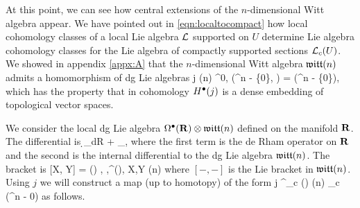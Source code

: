 \documentclass[11pt]{amsart}
\begin{document}
At this point, we can see how central extensions of the $n$-dimensional Witt algebra appear.
We have pointed out in \eqref{eqn:localtocompact} how local cohomology classes of a local Lie algebra $\mathcal L$ supported on $U$ determine Lie algebra cohomology classes for the Lie algebra of compactly supported sections $\mathcal L_c(U)$.
We showed in appendix \ref{appx:A} that the $n$-dimensional Witt algebra $\mathfrak{witt}(n)$ admits a homomorphism of dg Lie algebras
\beqn
j \colon {}(n) \hookrightarrow \Omega^{0,\bu} (\C^n - \{0\}, \T) = \cT(\C^n - \{0\}),
\eeqn
which has the property that in cohomology $H^\bullet(j)$ is a dense embedding of topological vector spaces.

We consider the local dg Lie algebra $\Omega^\bullet(\mathbf{R}) \otimes \mathfrak{witt}(n)$ defined on the manifold $\mathbf{R}$.
The differential is 
\beqn
\d_{dR} \otimes \id + \id \otimes \dbar_{},
\eeqn
where the first term is the de Rham operator on $\mathbf{R}$ and the second is the internal differential to the dg Lie algebra $\mathfrak{witt}(n)$.
The bracket is
\beqn\label{eqn:tensorbracket}
[\eta \otimes X, \theta \otimes Y] = (\eta \theta) \otimes [X,Y] , \quad \eta,\theta \in \Omega^\bu(\R), \;\; X,Y \in {}(n)
\eeqn
where $[-,-]$ is the Lie bracket in $\mathfrak{witt}(n)$.
Using $j$ we will construct a map (up to homotopy) of the form
\beqn
\til j \colon \Omega^\bu_c (\R) \otimes {}(n) \to \cT_c (\C^n - 0)
\eeqn
as follows.
\end{document}
